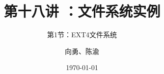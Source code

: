 


\title[第18讲]{第十八讲 ：文件系统实例} %
\subtitle{第1节：EXT4文件系统}
\author{向勇、陈渝} %
\date{\today} %



\begin{frame}
\titlepage %
\end{frame}

